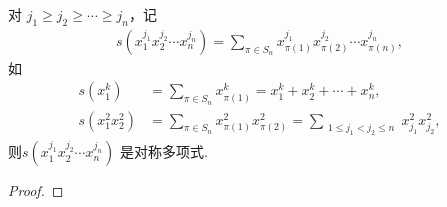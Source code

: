 \documentclass[../../main.tex]{subfiles}%
\begin{document}
\begin{example}\label{抽象代数--例题2.3.3}
对 \( j_1 \geqslant j_2 \geqslant \cdots \geqslant j_n \)，记
\begin{align*}
s(x_1^{j_1} x_2^{j_2} \cdots x_n^{j_n}) = \sum_{\pi \in S_n} x_{\pi(1)}^{j_1} x_{\pi(2)}^{j_2} \cdots x_{\pi(n)}^{j_n},
\end{align*}
如
\begin{align*}
s(x_1^k) &= \sum_{\pi \in S_n} x_{\pi(1)}^k = x_1^k + x_2^k + \cdots + x_n^k, \\
s(x_1^2 x_2^2) &= \sum_{\pi \in S_n} x_{\pi(1)}^2 x_{\pi(2)}^2 = \sum_{\substack{1 \leqslant j_1 < j_2 \leqslant n}} x_{j_1}^2 x_{j_2}^2,
\end{align*}
则\( s(x_1^{j_1} x_2^{j_2} \cdots x_n^{j_n}) \) 是对称多项式.
\end{example}
\begin{proof}



\end{proof}
\end{document}
